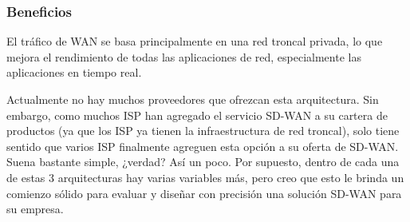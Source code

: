 \subsubsection{Beneficios}
\label{sec:Beneficios}

El tráfico de WAN se basa principalmente en una red troncal privada, lo que mejora el rendimiento de todas las aplicaciones de red, especialmente las aplicaciones en tiempo real.

Actualmente no hay muchos proveedores que ofrezcan esta arquitectura. Sin embargo, como muchos ISP han agregado el servicio SD-WAN a su cartera de productos (ya que los ISP ya tienen la infraestructura de red troncal), solo tiene sentido que varios ISP finalmente agreguen esta opción a su oferta de SD-WAN. Suena bastante simple, ¿verdad? Así un poco. Por supuesto, dentro de cada una de estas 3 arquitecturas hay varias variables más, pero creo que esto le brinda un comienzo sólido para evaluar y diseñar con precisión una solución SD-WAN para su empresa.

